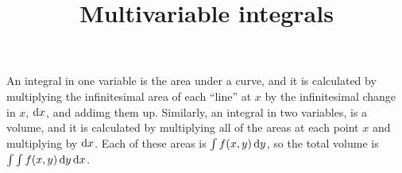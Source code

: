 

\title{Multivariable integrals}
\author{\name}
\maketitle

An integral in one variable is the area under a curve, and it is calculated by multiplying the infinitesimal area of each ``line'' at $x$ by the infinitesimal change in $x$, $\mathop{}\!\mathrm{d} x$, and addimg them up. Similarly, an integral in two variables, is a volume, and it is calculated by multiplying all of the areas at each point $x$ and multiplying by $\mathop{}\!\mathrm{d} x$. Each of these areas is $\int f(x, y) \mathop{}\!\mathrm{d} y$, so the total volume is $\int \int f(x, y) \mathop{}\!\mathrm{d} y \mathop{}\!\mathrm{d} x$.


